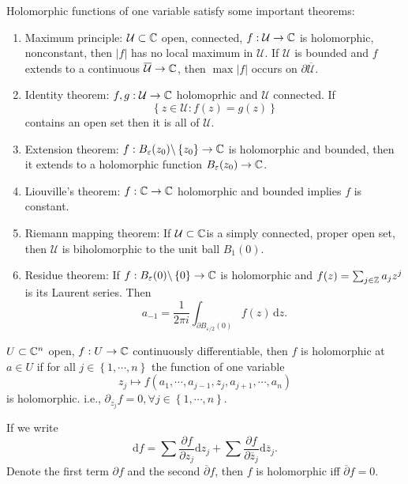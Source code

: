 Holomorphic functions of one variable satisfy some important theorems:
\begin{enumerate}
  \item Maximum principle: $\mathcal{U}\subset \mathbb{C}$ open, connected, $f:\mathcal{U}\to \mathbb{C}$ is holomorphic, nonconstant, then $|f|$ has no local maximum in $\mathcal{U}$. If $\mathcal{U}$ is bounded and $f$ extends to a continuous $\overline{\mathcal{U}}\to \mathbb{C}$, then $\max |f|$ occurs on $\partial \overline{\mathcal{U}}$.
  \item Identity theorem: $f,g:\mathcal{U}\to \mathbb{C}$ holomoprhic and $\mathcal{U}$ connected. If $$\left\{z\in \mathcal{U}:f(z)=g(z)\right\} $$ contains an open set then it is all of $\mathcal{U}$.
  \item Extension theorem: $f:B_\varepsilon (z_0) \backslash  \left\{z_0\right\} \to \mathbb{C}$ is holomorphic and bounded, then it extends to a holomorphic function $B_{\varepsilon }(z_0)\to \mathbb{C}$.
  \item Liouville's theorem: $f:\mathbb{C}\to \mathbb{C}$ holomorphic and bounded implies $f$ is constant.
  \item Riemann mapping theorem: If $\mathcal{U}\subset \mathbb{C}$is a simply connected, proper open set, then $\mathcal{U}$ is biholomorphic to the unit ball $B_1(0)$.
  \item Residue theorem: If $f:B_\varepsilon (0) \backslash  \left\{0\right\} \to \mathbb{C}$ is holomorphic and $f(z)=\sum_{j\in \mathbb{Z}}^{} a_jz^{j}$ is its Laurent series. Then
    \[
      a_{-1}=\frac{1}{2\pi i}\int_{\partial B_{\varepsilon  /2}(0)}f(z)\,\mathrm{d}z.
    \] 
\end{enumerate}


\begin{definition}
  $U\subset \mathbb{C}^{n}$ open, $f:U\to \mathbb{C}$ continuously differentiable,  then $f$ is holomorphic at $a\in U$ if for all $j\in \left\{1,\cdots ,n\right\} $ the function of one variable 
  \[
    z_j\mapsto f(a_1,\cdots ,a_{j-1}, z_j, a_{j+1},\cdots ,a_n)
  \] is holomorphic. i.e., $\partial_{\overline{z_j}}f=0,\forall j \in \left\{1,\cdots ,n\right\} $.
\end{definition}
If we write 
\[
\mathrm{d}f=\sum \frac{\partial f}{\partial z_j} \mathrm{d}z_j+\sum \frac{\partial f}{\partial \overline{z}_j} \mathrm{d}\overline{z}_j.
\] 
Denote the first term $\partial f$ and the second $\overline{\partial}f$, then $f$ is holomorphic iff $\overline{\partial}f=0$.

